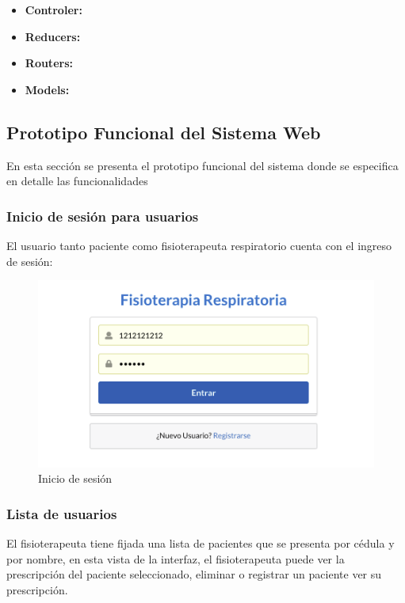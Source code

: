 \documentclass[12pt]{article}
\begin{document}
\begin{itemize}
    \item \textbf{Controler:}
    \item \textbf{Reducers:}
    \item \textbf{Routers:}
    \item \textbf{Models:}
    
    
\end{itemize}

\newpage


\subsection{Prototipo Funcional del Sistema Web }

En esta sección se presenta el prototipo funcional del sistema donde se especifica en detalle las funcionalidades

\subsubsection{Inicio de sesión para usuarios}

El usuario tanto paciente como fisioterapeuta respiratorio cuenta con el ingreso de sesión:

\begin{figure}[ht]
\centering
\includegraphics[scale=0.6]{imag/appiniciosesion.png}
\caption{Inicio de sesión}
\label{6}
\end{figure}
\FloatBarrier


\subsubsection{Lista de usuarios}

El fisioterapeuta tiene fijada una lista de pacientes que se presenta por cédula y por nombre, en esta vista de la interfaz, el fisioterapeuta puede ver la prescripción del paciente seleccionado, eliminar o registrar un paciente ver su prescripción.
\end{document}

